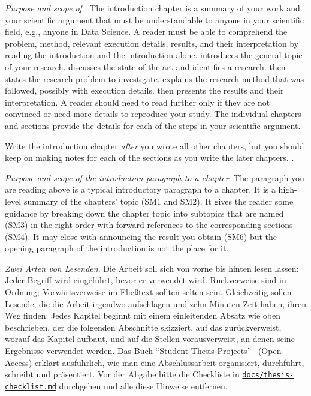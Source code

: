 \emph{Purpose and scope of }.
The introduction chapter is a summary of your work and your scientific argument that must be understandable to anyone in your scientific field, e.g., anyone in Data Science.
A reader must be able to comprehend the problem, method, relevant execution details, results, and their interpretation by reading the introduction and the introduction alone.
 introduces the general topic of your research.
 discusses the state of the art and identifies a research.
 then states the research problem to investigate.
 explains the research method that was followed, possibly with execution details.
 then presents the results and their interpretation.
A reader should need to read further only if they are not convinced or need more details to reproduce your study.
The individual chapters and sections provide the details for each of the steps in your scientific argument.

Write the introduction chapter \emph{after} you wrote all other chapters, but you should keep on making notes for each of the sections as you write the later chapters.
.

\emph{Purpose and scope of the introduction paragraph to a chapter}.
The paragraph you are reading above is a typical introductory paragraph to a chapter.
It is a high-level summary of the chapters' topic (SM1 and SM2).
It gives the reader some guidance by breaking down the chapter topic into subtopics that are named (SM3) in the right order with forward references to the corresponding sections (SM4).
It may close with announcing the result you obtain (SM6) but the opening paragraph of the introduction is not the place for it.

\emph{Zwei Arten von Lesenden}.
Die Arbeit soll sich von vorne bis hinten lesen lassen: Jeder Begriff wird eingeführt, bevor er verwendet wird.
Rückverweise sind in Ordnung; Vorwärtsverweise im Fließtext sollten selten sein.
Gleichzeitig sollen Lesende, die die Arbeit irgendwo aufschlagen und zehn Minuten Zeit haben, ihren Weg finden:
Jedes Kapitel beginnt mit einem einleitenden Absatz wie oben beschrieben, der die folgenden Abschnitte skizziert, auf das zurückverweist, worauf das Kapitel aufbaut, und auf die Stellen vorausverweist, an denen seine Ergebnisse verwendet werden.
Das Buch \enquote{Student Thesis Projects}~\cite{Lichter2026} (Open Access) erklärt ausführlich, wie man eine Abschlussarbeit organisiert, durchführt, schreibt und präsentiert.
Vor der Abgabe bitte die Checkliste in \href{https://github.com/latextemplates/scientific-thesis-template/blob/main/docs/thesis-checklist.md}{\texttt{docs/thesis-checklist.md}} durchgehen und alle diese Hinweise entfernen.

